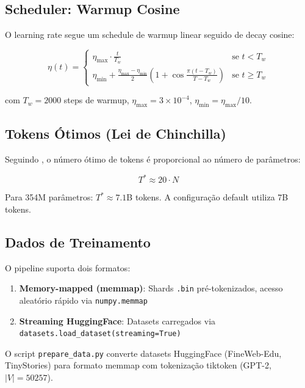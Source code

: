 \subsection{Scheduler: Warmup Cosine}

O learning rate segue um schedule de warmup linear seguido de decay cosine:

\begin{equation}
    \eta(t) = \begin{cases}
        \eta_{\max} \cdot \frac{t}{T_w} & \text{se } t < T_w \\
        \eta_{\min} + \frac{\eta_{\max} - \eta_{\min}}{2} \left(1 + \cos\frac{\pi(t - T_w)}{T - T_w}\right) & \text{se } t \geq T_w
    \end{cases}
\end{equation}

com $T_w = 2000$ steps de warmup, $\eta_{\max} = 3 \times 10^{-4}$,
$\eta_{\min} = \eta_{\max} / 10$.

\subsection{Tokens \'Otimos (Lei de Chinchilla)}

Seguindo \cite{hoffmann2022chinchilla}, o n\'umero \'otimo de tokens
\'e proporcional ao n\'umero de par\^ametros:

\begin{equation}
    T^* \approx 20 \cdot N
\end{equation}

Para 354M par\^ametros: $T^* \approx 7.1$B tokens. A configura\c{c}\~ao
default utiliza 7B tokens.

\subsection{Dados de Treinamento}

O pipeline suporta dois formatos:

\begin{enumerate}
    \item \textbf{Memory-mapped (memmap)}: Shards \texttt{.bin} pr\'e-tokenizados,
    acesso aleat\'orio r\'apido via \texttt{numpy.memmap}
    \item \textbf{Streaming HuggingFace}: Datasets carregados via
    \texttt{datasets.load\_dataset(streaming=True)}
\end{enumerate}

O script \texttt{prepare\_data.py} converte datasets HuggingFace
(FineWeb-Edu, TinyStories) para formato memmap com tokeniza\c{c}\~ao
tiktoken (GPT-2, $|V| = 50257$).

